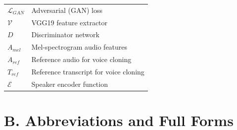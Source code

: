 \documentclass[12pt,oneside]{report}
\begin{document}
\begin{table}[H]
\begin{tabular}{@{}ll@{}}
$\mathcal{L}_{GAN}$ & Adversarial (GAN) loss \\
$\mathcal{V}$ & VGG19 feature extractor \\
$D$ & Discriminator network \\
$A_{mel}$ & Mel-spectrogram audio features \\
$A_{ref}$ & Reference audio for voice cloning \\
$T_{ref}$ & Reference transcript for voice cloning \\
$\mathcal{E}$ & Speaker encoder function \\
\bottomrule
\end{tabular}
\end{table}

\newpage
\section*{B. Abbreviations and Full Forms}
\end{document}
